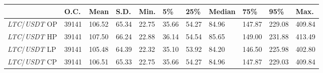 \begin{tabular}{lllllllllll}
\toprule
 & \textbf{O.C.} & \textbf{Mean} & \textbf{S.D.} & \textbf{Min.} & \textbf{5\%} & \textbf{25\%} & \textbf{Median} & \textbf{75\%} & \textbf{95\%} & \textbf{Max.} \\
\midrule
\emph{LTC}/\emph{USDT} OP & 39141 & 106.52 & 65.34 & 22.75 & 35.66 & 54.27 & 84.96 & 147.87 & 229.08 & 409.84 \\
\emph{LTC}/\emph{USDT} HP & 39141 & 107.50 & 66.24 & 22.88 & 36.14 & 54.54 & 85.65 & 149.00 & 231.88 & 413.49 \\
\emph{LTC}/\emph{USDT} LP & 39141 & 105.48 & 64.39 & 22.32 & 35.10 & 53.92 & 84.20 & 146.50 & 225.98 & 402.80 \\
\emph{LTC}/\emph{USDT} CP & 39141 & 106.51 & 65.33 & 22.75 & 35.66 & 54.27 & 84.96 & 147.87 & 229.03 & 409.84 \\
\bottomrule
\end{tabular}
